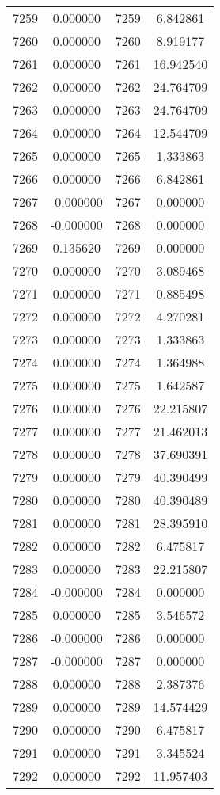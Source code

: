 \documentclass[12pt]{article}
\begin{document}
\begin{longtable}{@{}cccc@{}}
7259 & 0.000000 & 7259 & 6.842861 \\
7260 & 0.000000 & 7260 & 8.919177 \\
7261 & 0.000000 & 7261 & 16.942540 \\
7262 & 0.000000 & 7262 & 24.764709 \\
7263 & 0.000000 & 7263 & 24.764709 \\
7264 & 0.000000 & 7264 & 12.544709 \\
7265 & 0.000000 & 7265 & 1.333863 \\
7266 & 0.000000 & 7266 & 6.842861 \\
7267 & -0.000000 & 7267 & 0.000000 \\
7268 & -0.000000 & 7268 & 0.000000 \\
7269 & 0.135620 & 7269 & 0.000000 \\
7270 & 0.000000 & 7270 & 3.089468 \\
7271 & 0.000000 & 7271 & 0.885498 \\
7272 & 0.000000 & 7272 & 4.270281 \\
7273 & 0.000000 & 7273 & 1.333863 \\
7274 & 0.000000 & 7274 & 1.364988 \\
7275 & 0.000000 & 7275 & 1.642587 \\
7276 & 0.000000 & 7276 & 22.215807 \\
7277 & 0.000000 & 7277 & 21.462013 \\
7278 & 0.000000 & 7278 & 37.690391 \\
7279 & 0.000000 & 7279 & 40.390499 \\
7280 & 0.000000 & 7280 & 40.390489 \\
7281 & 0.000000 & 7281 & 28.395910 \\
7282 & 0.000000 & 7282 & 6.475817 \\
7283 & 0.000000 & 7283 & 22.215807 \\
7284 & -0.000000 & 7284 & 0.000000 \\
7285 & 0.000000 & 7285 & 3.546572 \\
7286 & -0.000000 & 7286 & 0.000000 \\
7287 & -0.000000 & 7287 & 0.000000 \\
7288 & 0.000000 & 7288 & 2.387376 \\
7289 & 0.000000 & 7289 & 14.574429 \\
7290 & 0.000000 & 7290 & 6.475817 \\
7291 & 0.000000 & 7291 & 3.345524 \\
7292 & 0.000000 & 7292 & 11.957403 \\

\end{longtable}
\end{document}
